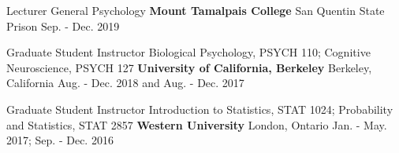 

\begin{cventries}

  \cventry
    {Lecturer} %
    {General Psychology} %
    {\textbf{Mount Tamalpais College}} %
    {San Quentin State Prison} %
    {Sep. - Dec. 2019} %
    
  \cventry
	{Graduate Student Instructor} %
	{Biological Psychology, PSYCH 110; Cognitive Neuroscience, PSYCH 127} %
    {\textbf{University of California, Berkeley}} %
    {Berkeley, California} %
    {Aug. - Dec. 2018 and Aug. - Dec. 2017} %
    
  \cventry
	{Graduate Student Instructor} %
	{Introduction to Statistics, STAT 1024; Probability and Statistics, STAT 2857} %
    {\textbf{Western University}} %
    {London, Ontario} %
    {Jan. - May. 2017; Sep. - Dec. 2016 } %
    
\end{cventries}
